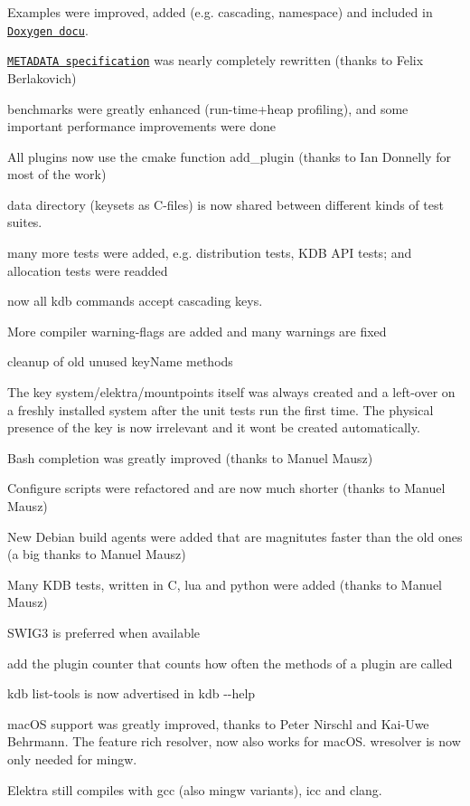 \begin{DoxyItemize}
\item Examples were improved, added (e.\+g. cascading, namespace) and included in \href{https://doc.libelektra.org/api/0.8.11/html}{\tt Doxygen docu}.
\item \href{https://github.com/ElektraInitiative/libelektra/blob/master/doc/METADATA.ini}{\tt M\+E\+T\+A\+D\+A\+TA specification} was nearly completely rewritten (thanks to Felix Berlakovich)
\item benchmarks were greatly enhanced (run-\/time+heap profiling), and some important performance improvements were done
\item All plugins now use the cmake function {\ttfamily add\+\_\+plugin} (thanks to Ian Donnelly for most of the work)
\item data directory (keysets as C-\/files) is now shared between different kinds of test suites.
\item many more tests were added, e.\+g. distribution tests, K\+DB A\+PI tests; and allocation tests were readded
\item now all kdb commands accept cascading keys.
\item More compiler warning-\/flags are added and many warnings are fixed
\item cleanup of old unused {\ttfamily key\+Name} methods
\item The key {\ttfamily system/elektra/mountpoints} itself was always created and a left-\/over on a freshly installed system after the unit tests run the first time. The physical presence of the key is now irrelevant and it won\textquotesingle{}t be created automatically.
\item Bash completion was greatly improved (thanks to Manuel Mausz)
\item Configure scripts were refactored and are now much shorter (thanks to Manuel Mausz)
\item New Debian build agents were added that are magnitutes faster than the old ones (a big thanks to Manuel Mausz)
\item Many K\+DB tests, written in C, lua and python were added (thanks to Manuel Mausz)
\item S\+W\+I\+G3 is preferred when available
\item add the plugin counter that counts how often the methods of a plugin are called
\item {\ttfamily kdb list-\/tools} is now advertised in {\ttfamily kdb -\/-\/help}
\item mac\+OS support was greatly improved, thanks to Peter Nirschl and Kai-\/\+Uwe Behrmann. The feature rich resolver, now also works for mac\+OS. wresolver is now only needed for mingw.
\item Elektra still compiles with gcc (also mingw variants), icc and clang.
\end{DoxyItemize}

